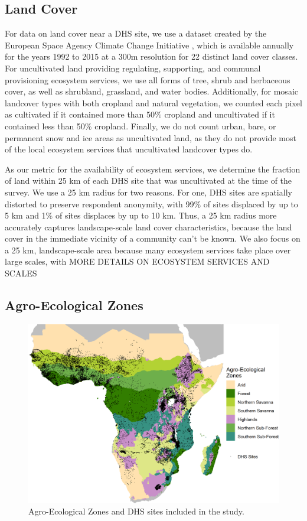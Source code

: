 \documentclass{article}
\begin{document}
\subsection{Land Cover}
For data on land cover near a DHS site, we use a dataset created by the European Space Agency Climate Change Initiative \cite{Defourny2017}, which is available annually for the years 1992 to 2015 at a 300m resolution for 22 distinct land cover classes.  For uncultivated land providing regulating, supporting, and communal provisioning ecosystem services, we use all forms of tree, shrub and herbaceous cover, as well as shrubland, grassland, and water bodies.  Additionally, for mosaic landcover types with both cropland and natural vegetation, we counted each pixel as cultivated if it contained more than 50\% cropland and uncultivated if it contained less than 50\% cropland.  Finally, we do not count urban, bare, or permanent snow and ice areas as uncultivated land, as they do not provide most of the local ecosystem services that uncultivated landcover types do.

As our metric for the availability of ecosystem services, we determine the fraction of land within 25 km of each DHS site that was uncultivated at the time of the survey.  We use a 25 km radius for two reasons.  For one, DHS sites are spatially distorted to preserve respondent anonymity, with 99\% of sites displaced by up to 5 km and 1\% of sites displaces by up to 10 km.  Thus, a 25 km radius more accurately captures landscape-scale land cover characteristics, because the land cover in the immediate vicinity of a community can't be known.  We also focus on a 25 km, landscape-scale area because many ecosystem services take place over large scales, with MORE DETAILS ON ECOSYSTEM SERVICES AND SCALES


\subsection{Agro-Ecological Zones}


\begin{figure}[h]
	\centering
	\includegraphics[width=0.8\linewidth]{AEZ_Sites.png}
	\caption{Agro-Ecological Zones and DHS sites included in the study.}
	\label{fig:AEZmap}
\end{figure}
\end{document}

